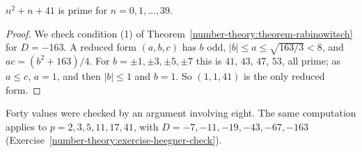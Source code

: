 \begin{corollary}\label{number-theory:corollary-euler-polynomial}
$n^2 + n + 41$ is prime for $n = 0, 1, \ldots, 39$.
\end{corollary}

\begin{proof}
We check condition (1) of Theorem~\ref{number-theory:theorem-rabinowitsch} for $D = -163$. A reduced form $(a, b, c)$ has $b$ odd, $|b| \leq a \leq \sqrt{163/3} < 8$, and $ac = (b^2 + 163)/4$. For
$b = \pm1, \pm3, \pm5, \pm7$ this is $41$, $43$, $47$, $53$, all prime; as $a \leq c$, $a = 1$, and then $|b| \leq 1$ and $b = 1$. So $(1, 1, 41)$ is the only reduced form.
\end{proof}

Forty values were checked by an argument involving eight. The same computation applies to $p = 2, 3, 5, 11, 17, 41$, with $D = -7, -11, -19, -43, -67, -163$ (Exercise~\ref{number-theory:exercise-heegner-check}).

